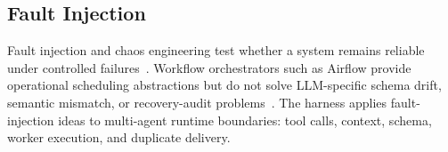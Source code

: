 \subsection{Fault Injection}

Fault injection and chaos engineering test whether a system remains reliable under controlled failures~\cite{chaosengineering}. Workflow orchestrators such as Airflow provide operational scheduling abstractions but do not solve LLM-specific schema drift, semantic mismatch, or recovery-audit problems~\cite{airflow}. The harness applies fault-injection ideas to multi-agent runtime boundaries: tool calls, context, schema, worker execution, and duplicate delivery.
